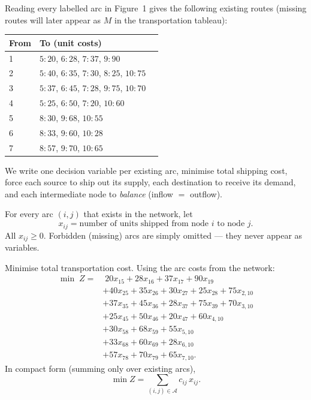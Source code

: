 Reading every labelled arc in Figure~1 gives the following existing routes
(missing routes will later appear as \(M\) in the transportation tableau):
\begin{center}
\renewcommand{\arraystretch}{1.15}
\begin{tabular}{@{}lll@{}}
\toprule
From & To (unit costs) & \\
\midrule
1 & \(5\!:20\),\; \(6\!:28\),\; \(7\!:37\),\; \(9\!:90\) \\
2 & \(5\!:40\),\; \(6\!:35\),\; \(7\!:30\),\; \(8\!:25\),\; \(10\!:75\) \\
3 & \(5\!:37\),\; \(6\!:45\),\; \(7\!:28\),\; \(9\!:75\),\; \(10\!:70\) \\
4 & \(5\!:25\),\; \(6\!:50\),\; \(7\!:20\),\; \(10\!:60\) \\
5 & \(8\!:30\),\; \(9\!:68\),\; \(10\!:55\) \\
6 & \(8\!:33\),\; \(9\!:60\),\; \(10\!:28\) \\
7 & \(8\!:57\),\; \(9\!:70\),\; \(10\!:65\) \\
\bottomrule
\end{tabular}
\end{center}


\begin{ideabox}
We write one decision variable per existing arc, minimise total shipping cost, force
each source to ship out its supply, each destination to receive its demand, and each
intermediate node to \emph{balance} (inflow $=$ outflow).
\end{ideabox}

For every arc \((i,j)\) that exists in the network, let
\[
  x_{ij} = \text{number of units shipped from node \(i\) to node \(j\)}.
\]
All \(x_{ij}\ge 0\). Forbidden (missing) arcs are simply omitted --- they never appear
as variables.

Minimise total transportation cost. Using the arc costs from the network:
\begin{align*}
\min\; Z =
&\; 20x_{15}+28x_{16}+37x_{17}+90x_{19} \\
&+40x_{25}+35x_{26}+30x_{27}+25x_{28}+75x_{2,10} \\
&+37x_{35}+45x_{36}+28x_{37}+75x_{39}+70x_{3,10} \\
&+25x_{45}+50x_{46}+20x_{47}+60x_{4,10} \\
&+30x_{58}+68x_{59}+55x_{5,10} \\
&+33x_{68}+60x_{69}+28x_{6,10} \\
&+57x_{78}+70x_{79}+65x_{7,10}.
\end{align*}
In compact form (summing only over existing arcs),
\[
  \min Z = \sum_{(i,j)\in\mathcal{A}} c_{ij}\, x_{ij}.
\]

